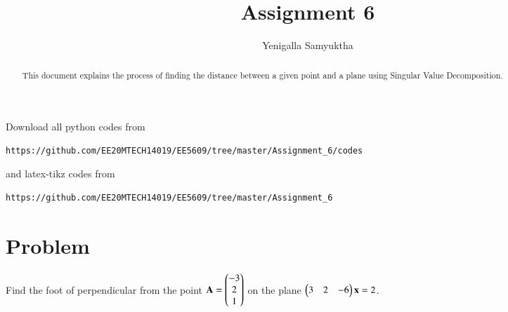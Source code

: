 \documentclass[journal,12pt,twocolumn]{IEEEtran}
\begin{document}
     \def\rightbox#1{\makebox[0in][r]{#1}}
     \def\centbox#1{\makebox[0in]{#1}}
     \def\topbox#1{\raisebox{-\baselineskip}[0in][0in]{#1}}
     \def\midbox#1{\raisebox{-0.5\baselineskip}[0in][0in]{#1}}
\vspace{3cm}
\title{Assignment 6}
\author{Yenigalla Samyuktha}
\maketitle
\newpage
\bigskip
\renewcommand{\thefigure}{\theenumi}
\renewcommand{\thetable}{\theenumi}
\begin{abstract}
This document explains the process of finding the distance between a given point and a plane using Singular Value Decomposition.
\end{abstract}
Download all python codes from 
\begin{lstlisting}
https://github.com/EE20MTECH14019/EE5609/tree/master/Assignment_6/codes
\end{lstlisting}
%
and latex-tikz codes from 
%
\begin{lstlisting}
https://github.com/EE20MTECH14019/EE5609/tree/master/Assignment_6
\end{lstlisting}
%
\section{Problem}
Find the foot of perpendicular from the point $\mathbf{A}=\begin{pmatrix}-3\\2\\1\end{pmatrix}$ on the plane $\begin{pmatrix}3&2&-6\end{pmatrix}\mathbf{x} = 2$.
\end{document}
